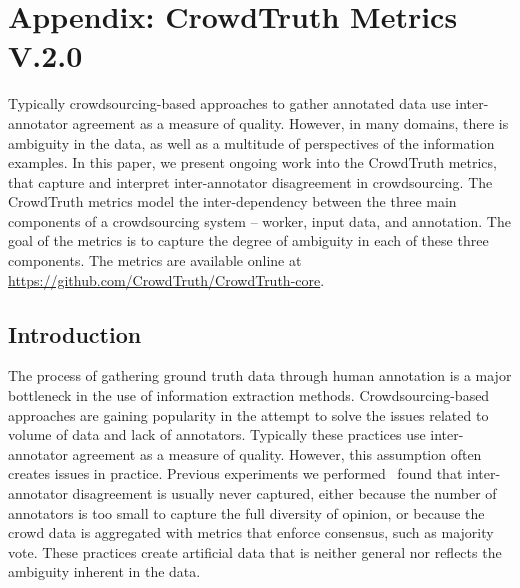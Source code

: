 
\chapter{Appendix: CrowdTruth Metrics V.2.0}

Typically crowdsourcing-based approaches to gather annotated data use inter-annotator agreement as a measure of quality. However, in many domains, there is ambiguity in the data, as well as a multitude of perspectives of the information examples. In this paper, we present ongoing work into the CrowdTruth metrics, that capture and interpret inter-annotator disagreement in crowdsourcing. The CrowdTruth metrics model the inter-dependency between the three main components of a crowdsourcing system -- worker, input data, and annotation. The goal of the metrics is to capture the degree of ambiguity in each of these three components. The metrics are available online at \url{https://github.com/CrowdTruth/CrowdTruth-core}.

\section{Introduction}

The process of gathering ground truth data through human annotation is a major bottleneck in the use of information extraction methods. Crowdsourcing-based approaches are gaining popularity in the attempt to solve the issues related to volume of data and lack of annotators. Typically these practices use inter-annotator agreement as a measure of quality. However, this assumption often creates issues in practice. Previous experiments we performed~\cite{aroyo2013crowd} found that inter-annotator disagreement is usually never captured, either because the number of annotators is too small to capture the full diversity of opinion, or because the crowd data is aggregated with metrics that enforce consensus, such as majority vote.  These practices create artificial data that is neither general nor reflects the ambiguity inherent in the data.

